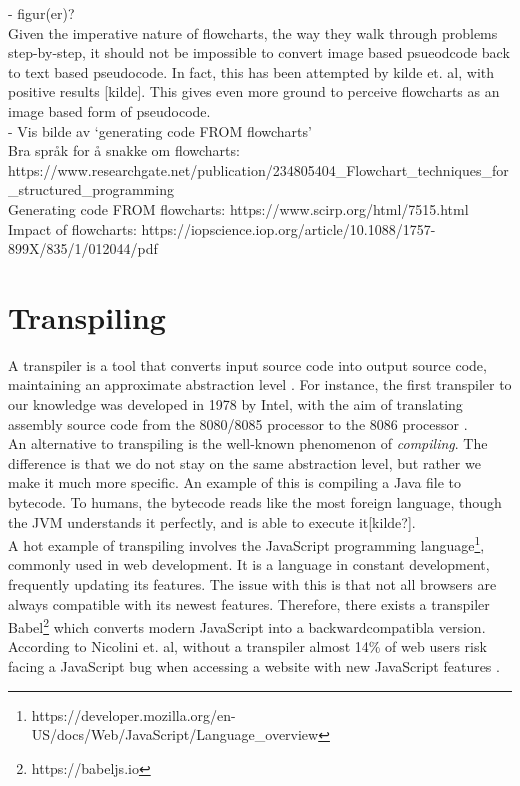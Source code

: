 - figur(er)? \\

Given the imperative nature of flowcharts, the way they walk through problems step-by-step, it should not be impossible to convert image based psueodcode back to text based pseudocode. In fact, this has been attempted by kilde et. al, with positive results [kilde]. This gives even more ground to perceive flowcharts as an image based form of pseudocode. \hfill \\

- Vis bilde av ‘generating code FROM flowcharts' \\

Bra språk for å snakke om flowcharts: https://www.researchgate.net/publication/234805404\_Flowchart\_techniques\_for\_structured\_programming \\

Generating code FROM flowcharts: https://www.scirp.org/html/7515.html \\

Impact of flowcharts: https://iopscience.iop.org/article/10.1088/1757-899X/835/1/012044/pdf


\section{Transpiling}

A transpiler is a tool that converts input source code into output source code, maintaining an approximate abstraction level \cite{DBLP:conf/els/MarcelinoL22}. For instance, the first transpiler to our knowledge was developed in 1978 by Intel, with the aim of translating assembly source code from the 8080/8085 processor to the 8086 processor \cite{intel1979}. \hfill \\

An alternative to transpiling is the well-known phenomenon of \textit{compiling}. The difference is that we do not stay on the same abstraction level, but rather we make it much more specific. An example of this is compiling a Java file to bytecode. To humans, the bytecode reads like the most foreign language, though the JVM understands it perfectly, and is able to execute it[kilde?]. \hfill \\

A hot example of transpiling involves the JavaScript programming language\footnote{https://developer.mozilla.org/en-US/docs/Web/JavaScript/Language\_overview}, commonly used in web development. It is a language in constant development, frequently updating its features. The issue with this is that not all browsers are always compatible with its newest features. Therefore, there exists a transpiler Babel\footnote{https://babeljs.io} which converts modern JavaScript into a backwardcompatibla version. According to Nicolini et. al, without a transpiler almost 14\% of web users risk facing a JavaScript bug when accessing a website with new JavaScript features \cite{DBLP:journals/software/NicoliniHF24}.

